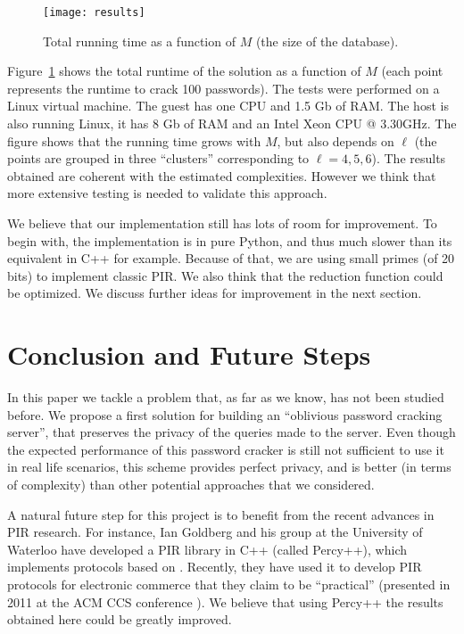 \documentclass{llncs}
\begin{document}
\begin{figure}[ht]
\centering
\texttt{[image: results]}
\caption{Total running time as a function of $M$ (the size of the database).}
\label{fig:results}
\end{figure}

Figure~\ref{fig:results} shows the total runtime of the solution 
as a function of $M$ (each point represents the runtime 
to crack 100 passwords).
The tests were performed on a Linux virtual machine. The guest
has one CPU and 1.5 Gb of RAM. The host is also running Linux, it has 8
Gb of RAM and an Intel Xeon CPU @ 3.30GHz.
The figure shows that the running time grows with $M$, but
also depends on $\ell$ (the points are grouped in three ``clusters''
corresponding to $\ell = 4,5,6$).
The results obtained are coherent with the estimated complexities.
However we think that more extensive testing is needed to validate
this approach.

We believe that our implementation still has lots of room for improvement.
To begin with, the implementation is in pure Python,
and thus much slower than its equivalent in C++ for example.
Because of that, we are using small primes (of 20 bits) 
to implement classic PIR.
We also think that the reduction function could be optimized. 
We discuss further ideas for improvement in the next section.




\section{Conclusion and Future Steps} \label{sec:conclusion}

In this paper we tackle a problem that, as far as we know,
has not been studied before. We propose a first solution
for building an ``oblivious password cracking server'', 
that preserves the privacy of the queries made to the server.
Even though the expected performance of this password cracker
is still not sufficient to use it in real life scenarios, 
this scheme provides perfect privacy,
and is better (in terms of complexity) than other potential approaches
that we considered.

A natural future step for this project is 
to benefit from the recent advances in PIR research.
For instance, Ian Goldberg and his group
at the University of Waterloo have developed a PIR library in C++
(called Percy++), which implements protocols based on \cite{Goldberg07}.
Recently, they have used it to develop
PIR protocols for electronic commerce that they claim to 
be ``practical'' (presented in 2011 at the ACM CCS conference
\cite{HenOluGol11}).
We believe that using Percy++ the results obtained here could
be greatly improved.
\end{document}
